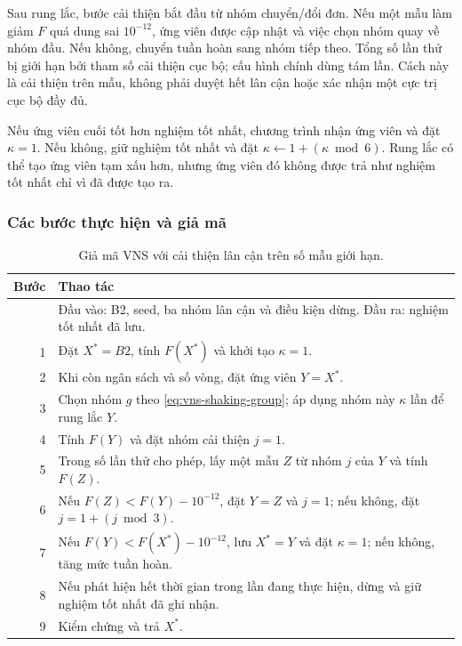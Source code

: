 Sau rung lắc, bước cải thiện bắt đầu từ nhóm chuyển/đổi đơn. Nếu một mẫu làm giảm $F$ quá dung sai $10^{-12}$, ứng viên được cập nhật và việc chọn nhóm quay về nhóm đầu. Nếu không, chuyển tuần hoàn sang nhóm tiếp theo. Tổng số lần thử bị giới hạn bởi tham số cải thiện cục bộ; cấu hình chính dùng tám lần. Cách này là cải thiện trên mẫu, không phải duyệt hết lân cận hoặc xác nhận một cực trị cục bộ đầy đủ.

Nếu ứng viên cuối tốt hơn nghiệm tốt nhất, chương trình nhận ứng viên và đặt $\kappa=1$. Nếu không, giữ nghiệm tốt nhất và đặt $\kappa\leftarrow1+(\kappa\bmod6)$. Rung lắc có thể tạo ứng viên tạm xấu hơn, nhưng ứng viên đó không được trả như nghiệm tốt nhất chỉ vì đã được tạo ra.

\subsubsection{Các bước thực hiện và giả mã}
\begin{table}[H]
\centering\small
\begin{tabularx}{\linewidth}{rX}
\toprule
Bước & Thao tác \\
\midrule
 & Đầu vào: B2, seed, ba nhóm lân cận và điều kiện dừng. Đầu ra: nghiệm tốt nhất đã lưu. \\
1 & Đặt $X^*=B2$, tính $F(X^*)$ và khởi tạo $\kappa=1$. \\
2 & Khi còn ngân sách và số vòng, đặt ứng viên $Y=X^*$. \\
3 & Chọn nhóm $g$ theo \eqref{eq:vns-shaking-group}; áp dụng nhóm này $\kappa$ lần để rung lắc $Y$. \\
4 & Tính $F(Y)$ và đặt nhóm cải thiện $j=1$. \\
5 & Trong số lần thử cho phép, lấy một mẫu $Z$ từ nhóm $j$ của $Y$ và tính $F(Z)$. \\
6 & Nếu $F(Z)<F(Y)-10^{-12}$, đặt $Y=Z$ và $j=1$; nếu không, đặt $j=1+(j\bmod3)$. \\
7 & Nếu $F(Y)<F(X^*)-10^{-12}$, lưu $X^*=Y$ và đặt $\kappa=1$; nếu không, tăng mức tuần hoàn. \\
8 & Nếu phát hiện hết thời gian trong lần đang thực hiện, dừng và giữ nghiệm tốt nhất đã ghi nhận. \\
9 & Kiểm chứng và trả $X^*$. \\
\bottomrule
\end{tabularx}
\caption{Giả mã VNS với cải thiện lân cận trên số mẫu giới hạn.}\label{tab:vns-pseudocode}
\end{table}


